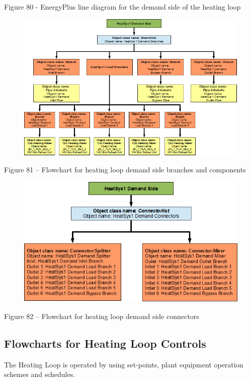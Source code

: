 Figure 80 - EnergyPlus line diagram for the demand side of the heating loop

\begin{figure}[htbp]
\centering
\includegraphics{media/image081.png}
\caption{}
\end{figure}

Figure 81 -- Flowchart for heating loop demand side branches and components

\begin{figure}[htbp]
\centering
\includegraphics{media/image082.png}
\caption{}
\end{figure}

Figure 82 -- Flowchart for heating loop demand side connectors

\subsection{Flowcharts for Heating Loop Controls}\label{flowcharts-for-heating-loop-controls}

The Heating Loop is operated by using set-points, plant equipment operation schemes and schedules.

